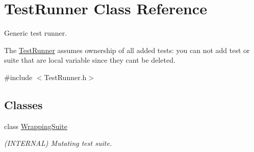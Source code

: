 \hypertarget{class_test_runner}{}\section{Test\+Runner Class Reference}
\label{class_test_runner}


Generic test runner.

The \hyperlink{class_test_runner}{Test\+Runner} assumes ownership of all added tests\+: you can not add test or suite that are local variable since they can\textquotesingle{}t be deleted.  




{\ttfamily \#include $<$Test\+Runner.\+h$>$}

\subsection*{Classes}
\begin{DoxyCompactItemize}
\item 
class \hyperlink{class_test_runner_1_1_wrapping_suite}{Wrapping\+Suite}
\begin{DoxyCompactList}\small\item\em (I\+N\+T\+E\+R\+N\+AL) Mutating test suite. \end{DoxyCompactList}\end{DoxyCompactItemize}
